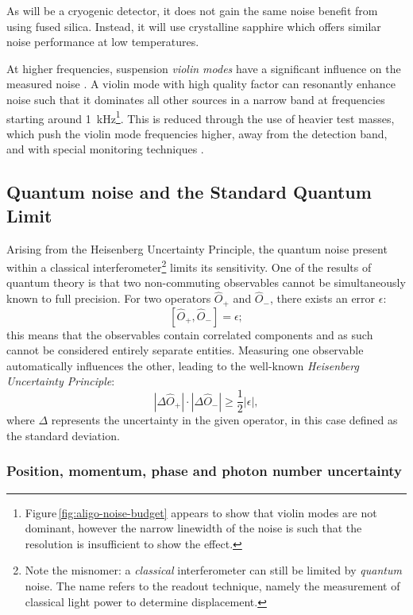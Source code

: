 As \KAGRA{} will be a cryogenic detector, it does not gain the same noise benefit from using fused silica. Instead, it will use crystalline sapphire which offers similar noise performance at low temperatures.

At higher frequencies, suspension \emph{violin modes} have a significant influence on the measured noise \cite{Robertson2002}. A violin mode with high quality factor can resonantly enhance noise such that it dominates all other sources in a narrow band at frequencies starting around \SI{1}{\kilo\hertz}\footnote{Figure\,\ref{fig:aligo-noise-budget} appears to show that violin modes are not dominant, however the narrow linewidth of the noise is such that the resolution is insufficient to show the effect.}. This is reduced through the use of heavier test masses, which push the violin mode frequencies higher, away from the detection band, and with special monitoring techniques \cite{Sorazu2010}.

\subsection{\label{sec:quantum-noise}Quantum noise and the Standard Quantum Limit}
Arising from the Heisenberg Uncertainty Principle, the quantum noise present within a classical interferometer\footnote{Note the misnomer: a \emph{classical} interferometer can still be limited by \emph{quantum} noise. The name refers to the readout technique, namely the measurement of classical light power to determine displacement.} limits its sensitivity. One of the results of quantum theory is that two non-commuting observables cannot be simultaneously known to full precision. For two operators $\hat{O}_+$ and $\hat{O}_-$, there exists an error $\epsilon$:
\begin{equation}
 \left[ \hat{O}_+, \hat{O}_- \right] = \epsilon;
\end{equation}
this means that the observables contain correlated components and as such cannot be considered entirely separate entities. Measuring one observable automatically influences the other, leading to the well-known \emph{Heisenberg Uncertainty Principle}:
\begin{equation}
 \left| \Delta \hat{O}_+ \right| \cdot \left| \Delta \hat{O}_- \right| \geq
\frac{1}{2} \left| \epsilon \right|,
\end{equation}
where $\Delta$ represents the uncertainty in the given operator, in this case defined as the standard deviation.

\subsubsection{\label{sec:operator-uncertainty}Position, momentum, phase and photon number uncertainty}

